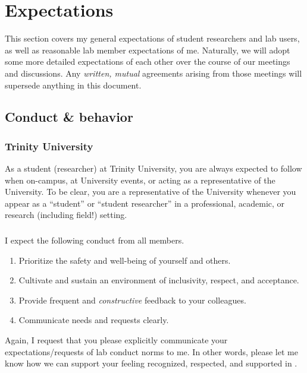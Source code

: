 
\section{Expectations}
This section covers my general expectations of student researchers and lab users, as well as reasonable lab member expectations of me.
Naturally, we will adopt some more detailed expectations of each other over the course of our meetings and discussions. 
Any \emph{written, mutual} agreements arising from those meetings will supersede anything in this document.


\subsection{Conduct \& behavior}
\subsubsection{Trinity University} 
As a student (researcher) at Trinity University, you are always expected to follow  when on-campus, at University events, or acting as a representative of the University.
To be clear, you are a representative of the University whenever you appear as a ``student'' or ``student researcher'' in a professional, academic, or research (including field!) setting. 

\subsubsection{\grackle}

I expect the following conduct from all \grackle{} members.
\begin{enumerate}\setlength{\itemsep}{0ex}
    \item Prioritize the safety and well-being of yourself and others.
    \item Cultivate and sustain an environment of inclusivity, respect, and acceptance.
    \item Provide frequent and \emph{constructive} feedback to your colleagues.
    \item Communicate needs and requests clearly.
\end{enumerate}
Again, I request that you please explicitly communicate your expectations/requests of lab conduct norms to me.
In other words, please let me know how we can support your feeling recognized, respected, and supported in \grackle. 


